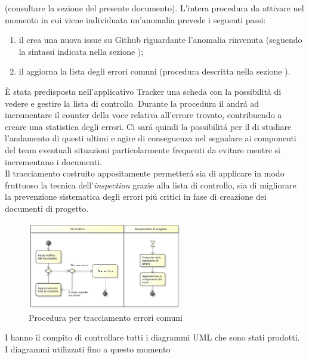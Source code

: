 			(consultare la sezione  del presente documento). L'intera procedura da attivare nel momento in cui viene individuata 
			un'anomalia prevede i seguenti passi:
			\begin{enumerate}
				\item il  crea una nuova issue su Github riguardante l'anomalia rinvenuta (seguendo la sintassi indicata nella 
				sezione );
				\item il  aggiorna la lista degli errori comuni (procedura descritta nella sezione ).
			\end{enumerate}
			\label{sec:tracciamento}
			È stata predisposta nell'applicativo Tracker una scheda con la possibilità di vedere e gestire la lista di controllo. Durante la procedura 
			il  andr\'a ad incrementare il counter della voce relativa all'errore trovato, contribuendo a creare una statistica 
			degli errori. Ci sar\'a quindi la possibilit\'a per il  di studiare l'andamento di questi ultimi e agire 
			di conseguenza nel segnalare ai componenti del team eventuali situazioni particolarmente frequenti da evitare mentre si incrementano i 
			documenti.\\
			Il tracciamento costruito appositamente permetter\'a sia di applicare in modo fruttuoso la tecnica dell'\textit{inspection} grazie alla 
			lista di controllo, sia di migliorare la prevenzione sistematica degli errori pi\'u critici in fase di creazione dei documenti di progetto.
			\begin{figure}[H]
					\centering
					\includegraphics[width=0.6\textwidth]{NormeDiProgetto/Pics/ProceduraDecrementoErrori}
					\caption{Procedura per tracciamento errori comuni}
			\end{figure}
			I  hanno il compito di controllare tutti i diagrammi UML che sono stati prodotti. I diagrammi utilizzati fino a questo momento 
